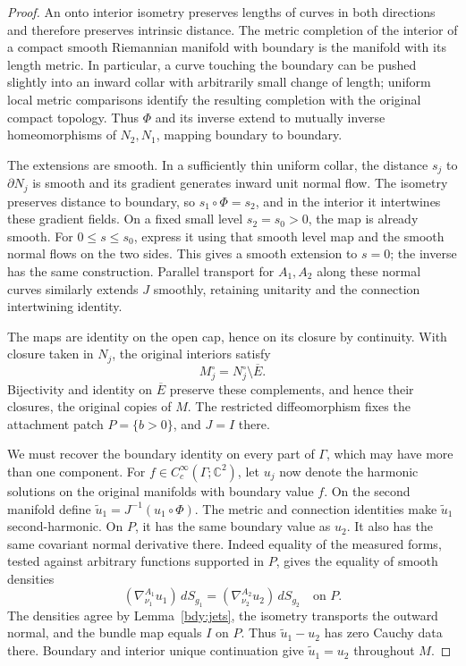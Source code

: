 \begin{proof}
An onto interior isometry preserves lengths of curves in both
directions and therefore preserves intrinsic distance.  The
metric completion of the interior of a compact smooth
Riemannian manifold with boundary is the manifold with its length
metric.  In particular, a curve touching the boundary can be
pushed slightly into an inward collar with arbitrarily small
change of length; uniform local metric comparisons identify
the resulting completion with the original compact topology.
Thus \(\Phi\) and its inverse extend to mutually inverse
homeomorphisms of \(N_2,N_1\), mapping boundary to boundary.

The extensions are smooth.  In a sufficiently thin uniform
collar, the distance \(s_j\) to \(\partial N_j\) is smooth and
its gradient generates inward unit normal flow.  The isometry
preserves distance to boundary, so
\(s_1\circ\Phi=s_2\), and in the interior it intertwines these
gradient fields.  On a fixed small level \(s_2=s_0>0\), the map
is already smooth.  For \(0\le s\le s_0\), express it using
that smooth level map and the smooth normal flows on the two
sides.  This gives a smooth extension to \(s=0\); the inverse
has the same construction.  Parallel transport for \(A_1,A_2\)
along these normal curves similarly extends \(J\) smoothly,
retaining unitarity and the connection intertwining identity.

The maps are identity on the open cap, hence on its closure by
continuity.  With closure taken in \(N_j\), the original interiors satisfy
\[
          M_j^\circ=N_j^\circ\setminus\overline E.
\]
Bijectivity and identity on \(\overline E\) preserve these
complements, and hence their closures, the original copies of
\(M\).  The restricted diffeomorphism fixes the attachment patch
\(P=\{b>0\}\), and \(J=I\) there.

We must recover the boundary identity on every part of
\(\Gamma\), which may have more than one component.  For
\(f\in C_c^\infty(\Gamma;\mathbb C^2)\), let \(u_j\) now denote
the harmonic solutions on the original manifolds with boundary
value \(f\).  On the second manifold define
\(\widetilde u_1=J^{-1}(u_1\circ\Phi)\).  The metric and
connection identities make \(\widetilde u_1\) second-harmonic.
On \(P\), it has the same boundary value as \(u_2\).  It also
has the same covariant normal derivative there.  Indeed equality
of the measured forms, tested against arbitrary functions
supported in \(P\), gives the equality of smooth densities
\[
 (\nabla^{A_1}_{\nu_1}u_1)\,dS_{g_1}
       =(\nabla^{A_2}_{\nu_2}u_2)\,dS_{g_2}
                                      \quad\text{on }P.
\]
The densities agree by Lemma~\ref{bdy:jets}, the isometry
transports the outward normal, and the bundle map equals \(I\)
on \(P\).  Thus \(\widetilde u_1-u_2\) has zero Cauchy data
there.  Boundary and interior unique continuation give
\(\widetilde u_1=u_2\) throughout \(M\).


\end{proof}
